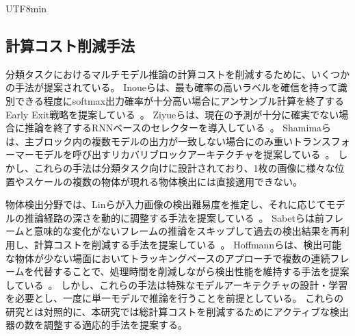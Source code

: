 \documentclass[conference, dvipdfmx]{IEEEtran}
\begin{document}
\begin{CJK}{UTF8}{min}
\subsection{計算コスト削減手法}
分類タスクにおけるマルチモデル推論の計算コストを削減するために、いくつかの手法が提案されている。
Inoueらは、最も確率の高いラベルを確信を持って識別できる程度にsoftmax出力確率が十分高い場合にアンサンブル計算を終了するEarly Exit戦略を提案している~\cite{Inoue2017}。
Ziyueらは、現在の予測が十分に確実でない場合に推論を終了するRNNベースのセレクターを導入している~\cite{Li2023}。
Shamimaらは、主ブロック内の複数モデルの出力が一致しない場合にのみ重いトランスフォーマーモデルを呼び出すリカバリブロックアーキテクチャを提案している~\cite{Afrin2024}。
しかし、これらの手法は分類タスク向けに設計されており、1枚の画像に様々な位置やスケールの複数の物体が現れる物体検出には直接適用できない。

物体検出分野では、Linらが入力画像の検出難易度を推定し、それに応じてモデルの推論経路の深さを動的に調整する手法を提案している~\cite{DynamicDet2023}。
Sabetらは前フレームと意味的な変化がないフレームの推論をスキップして過去の検出結果を再利用し、計算コストを削減する手法を提案している~\cite{sabet2021temporalearlyexitsefficient}。
Hoffmannらは、検出可能な物体が少ない場面においてトラッキングベースのアプローチで複数の連続フレームを代替することで、処理時間を削減しながら検出性能を維持する手法を提案している~\cite{Hoffmann2021}。
しかし、これらの手法は特殊なモデルアーキテクチャの設計・学習を必要とし、一度に単一モデルで推論を行うことを前提としている。
これらの研究とは対照的に、本研究では総計算コストを削減するためにアクティブな検出器の数を調整する適応的手法を提案する。


\end{CJK}
\end{document}

